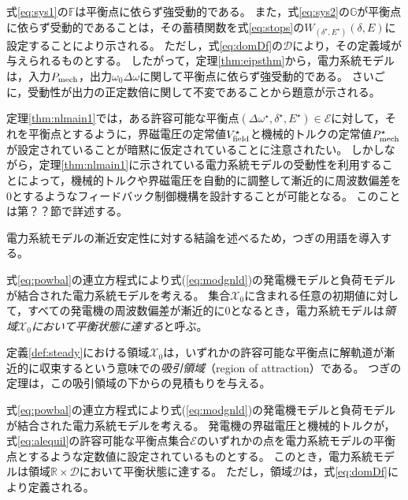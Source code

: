 \documentclass[tombow,dvipdfmx]{corona-a5-1.1}
\begin{document}
\begin{証明}
式\ref{eq:sys1}の$\mathds{F}$は平衡点に依らず強受動的である。
また，式\ref{eq:sys2}の$\mathds{G}$が平衡点に依らず受動的であることは，その蓄積関数を式\ref{eq:stops}の$W_{(\delta^{\star},E^{\star})}(\delta,E)$に設定することにより示される。
ただし，式\ref{eq:domDf}の$\mathcal{D}$により，その定義域が与えられるものとする。
したがって，定理\ref{thm:eipsthm}から，電力系統モデルは，入力$P_{\rm mech}$，出力$\omega_0 \Delta \omega$に関して平衡点に依らず強受動的である。
さいごに，受動性が出力の正定数倍に関して不変であることから題意が示される。
\end{証明}

定理\ref{thm:nlmain1}では，ある許容可能な平衡点$(\Delta \omega^{\star},\delta^{\star},E^{\star}) \in \mathcal{E}$に対して，それを平衡点とするように，界磁電圧の定常値$V_{\rm field}^{\star}$と機械的トルクの定常値$P_{\rm mech}^{\star}$が設定されていることが暗黙に仮定されていることに注意されたい。
しかしながら，定理\ref{thm:nlmain1}に示されている電力系統モデルの受動性を利用することによって，機械的トルクや界磁電圧を自動的に調整して漸近的に周波数偏差を0とするようなフィードバック制御機構を設計することが可能となる。
このことは第？？節で詳述する。

電力系統モデルの漸近安定性に対する結論を述べるため，つぎの用語を導入する。

\begin{定義}[電力系統モデルの平衡状態に関する吸引領域]\label{def:steady}
式\ref{eq:powbal}の連立方程式により式(\ref{eq:modgnld})の発電機モデルと負荷モデルが結合された電力系統モデルを考える。
集合$\mathcal{X}_0$に含まれる任意の初期値に対して，すべての発電機の周波数偏差が漸近的に0となるとき，電力系統モデルは\emph{領域$\mathcal{X}_0$において平衡状態に達する}と呼ぶ。
\end{定義}

定義\ref{def:steady}における領域$\mathcal{X}_0$は，いずれかの許容可能な平衡点に解軌道が漸近的に収束するという意味での\emph{吸引領域}（region of attraction）である。
つぎの定理は，この吸引領域の下からの見積もりを与える。


\begin{定理}[吸引領域の下からの見積もり]\label{thm:nlmain2}
式\ref{eq:powbal}の連立方程式により式(\ref{eq:modgnld})の発電機モデルと負荷モデルが結合された電力系統モデルを考える。
発電機の界磁電圧と機械的トルクが，式\ref{eq:alequil}の許容可能な平衡点集合$\mathcal{E}$のいずれかの点を電力系統モデルの平衡点とするような定数値に設定されているものとする。
このとき，電力系統モデルは領域$\mathbb{R}\times \mathcal{D}$において平衡状態に達する。
ただし，領域$\mathcal{D}$は，式\ref{eq:domDf}により定義される。
\end{定理}
\end{document}

